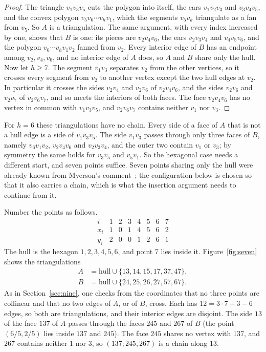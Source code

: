 \documentclass[11pt]{amsart}
\theoremstyle{definition}
\begin{document}
\begin{proof}
The triangle $v_1v_3v_5$ cuts the polygon into itself, the ears $v_1v_2v_3$ and $v_3v_4v_5$, and the convex polygon $v_5v_6\cdots v_hv_1$, which the segments $v_5v_k$ triangulate as a fan from $v_5$. So $A$ is a triangulation. The same argument, with every index increased by one, shows that $B$ is one: its pieces are $v_2v_4v_6$, the ears $v_2v_3v_4$ and $v_4v_5v_6$, and the polygon $v_6\cdots v_hv_1v_2$ fanned from $v_2$. Every interior edge of $B$ has an endpoint among $v_2,v_4,v_6$, and no interior edge of $A$ does, so $A$ and $B$ share only the hull. Now let $h\geq7$. The segment $v_1v_3$ separates $v_2$ from the other vertices, so it crosses every segment from $v_2$ to another vertex except the two hull edges at $v_2$. In particular it crosses the sides $v_2v_4$ and $v_2v_6$ of $v_2v_4v_6$, and the sides $v_2v_6$ and $v_2v_7$ of $v_2v_6v_7$, and so meets the interiors of both faces. The face $v_2v_4v_6$ has no vertex in common with $v_1v_3v_5$, and $v_2v_6v_7$ contains neither $v_1$ nor $v_3$.
\end{proof}

For $h=6$ these triangulations have no chain. Every side of a face of $A$ that is not a hull edge is a side of $v_1v_3v_5$. The side $v_1v_3$ passes through only three faces of $B$, namely $v_6v_1v_2$, $v_2v_4v_6$ and $v_2v_3v_4$, and the outer two contain $v_1$ or $v_3$; by symmetry the same holds for $v_3v_5$ and $v_5v_1$. So the hexagonal case needs a different start, and seven points suffice. Seven points sharing only the hull were already known from Myerson's comment~\cite{MO}; the configuration below is chosen so that it also carries a chain, which is what the insertion argument needs to continue from it.

Number the points as follows.
\[
\begin{array}{c|ccccccc}
 i & 1 & 2 & 3 & 4 & 5 & 6 & 7\\\hline
 x_i & 1 & 0 & 1 & 4 & 5 & 6 & 2\\
 y_i & 2 & 0 & 0 & 1 & 2 & 6 & 1
\end{array}
\]
The hull is the hexagon $1,2,3,4,5,6$, and point $7$ lies inside it. Figure~\ref{fig:seven} shows the triangulations
\begin{align*}
A&=\text{hull}\cup\{13,14,15,17,37,47\},\\
B&=\text{hull}\cup\{24,25,26,27,57,67\}.
\end{align*}
As in Section~\ref{sec:nine}, one checks from the coordinates that no three points are collinear and that no two edges of $A$, or of $B$, cross. Each has $12=3\cdot7-3-6$ edges, so both are triangulations, and their interior edges are disjoint. The side $13$ of the face $137$ of $A$ passes through the faces $245$ and $267$ of $B$ (the point $(6/5,2/5)$ lies inside $137$ and $245$). The face $245$ shares no vertex with $137$, and $267$ contains neither $1$ nor $3$, so $(137;245,267)$ is a chain along $13$.
\end{document}
